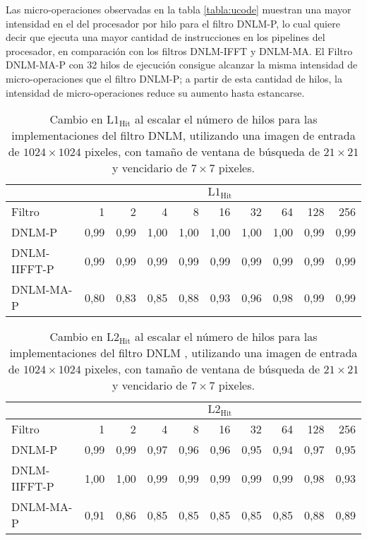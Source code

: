 Las micro-operaciones observadas en la tabla \ref{tabla:ucode} muestran una mayor intensidad en el  del procesador por hilo para el filtro DNLM-P, lo cual quiere decir que ejecuta una mayor cantidad de instrucciones en los pipelines del procesador, en comparaci\'on con los filtros DNLM-IFFT y DNLM-MA. El Filtro DNLM-MA-P  con 32 hilos de ejecuci\'on consigue alcanzar la misma intensidad de micro-operaciones que el filtro DNLM-P; a partir de esta cantidad de hilos, la intensidad de micro-operaciones reduce su aumento hasta estancarse. 

\begin{table}[htb]
\centering
\caption[Cambio en la raz\'on de aciertos de lectura en cach\'e L1 al escalar el n\'umero de hilos]{Cambio en  $\text{L1}_{\text{Hit}}$ al escalar el n\'umero de hilos para las implementaciones del filtro DNLM, utilizando una imagen de entrada de $1024 \times 1024$ pixeles, con tama\~no de ventana de búsqueda de $21 \times 21$ y vencidario de $7 \times 7$ pixeles. \label{tabla:l1_hit}}
\begin{tabular}{lrrrrrrrrr}
& \multicolumn{9}{c}{$\text{L1}_{\text{Hit}}$} \tabularnewline
\hline
 Filtro & 1 & 2 & 4 & 8 & 16 & 32 & 64 & 128 & 256 \tabularnewline
\hline
DNLM-P & 0,99 & 0,99 & 1,00 & 1,00 & 1,00 & 1,00 & 1,00 & 0,99 & 0,99 \tabularnewline
DNLM-IIFFT-P & 0,99 & 0,99 & 0,99 & 0,99 & 0,99 & 0,99 & 0,99 & 0,99 & 0,99 \tabularnewline
DNLM-MA-P & 0,80 & 0,83 & 0,85 & 0,88 & 0,93 & 0,96 & 0,98 & 0,99 & 0,99 \tabularnewline
\end{tabular}
\end{table}


\begin{table}[htb]
\centering
\caption[Cambio en la raz\'on de aciertos de lectura en cach\'e L2 al escalar el n\'umero de hilos]{Cambio en  $\text{L2}_{\text{Hit}}$ al escalar el n\'umero de hilos para las implementaciones del filtro DNLM , utilizando una imagen de entrada de $1024 \times 1024$ pixeles, con tama\~no de ventana de búsqueda de $21 \times 21$ y vencidario de $7 \times 7$ pixeles. \label{tabla:l2_hit}}
\begin{tabular}{lrrrrrrrrr}
& \multicolumn{9}{c}{$\text{L2}_{\text{Hit}}$} \tabularnewline
\hline
 Filtro & 1 & 2 & 4 & 8 & 16 & 32 & 64 & 128 & 256 \tabularnewline
\hline
DNLM-P & 0,99 & 0,99 & 0,97 & 0,96 & 0,96 & 0,95 & 0,94 & 0,97 & 0,95 \tabularnewline
DNLM-IIFFT-P & 1,00 & 1,00 & 0,99 & 0,99 & 0,99 & 0,99 & 0,99 & 0,98 & 0,93 \tabularnewline
DNLM-MA-P & 0,91 & 0,86 & 0,85 & 0,85 & 0,85 & 0,85 & 0,85 & 0,88 & 0,89 \tabularnewline
\end{tabular}
\end{table}


